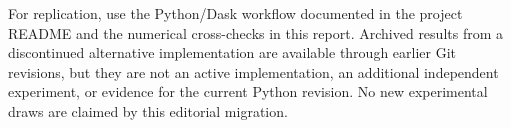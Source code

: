 For replication, use the Python/Dask workflow documented in the project
README and the numerical cross-checks in this report. Archived results
from a discontinued alternative implementation are available through
earlier Git revisions, but they are not an active implementation, an
additional independent experiment, or evidence for the current Python
revision. No new experimental draws are claimed by this editorial migration.

\clearpage




\clearpage



\ProjectReportAIAppendix

